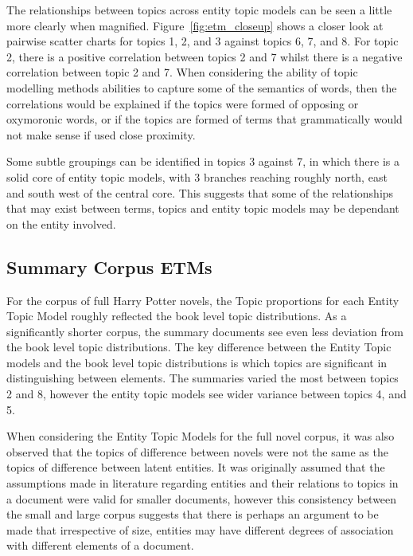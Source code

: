 \documentclass[10pt]{report}
\begin{document}
The relationships between topics across entity topic models can be seen a little more clearly when magnified. Figure~\ref{fig:etm_closeup} shows a closer look at pairwise scatter charts for topics 1, 2, and 3 against topics 6, 7, and 8. For topic 2, there is a positive correlation between topics 2 and 7 whilst there is a negative correlation between topic 2 and 7. When considering the ability of topic modelling methods abilities to capture some of the semantics of words, then the correlations would be explained if the topics were formed of opposing or oxymoronic words, or if the topics are formed of terms that grammatically would not make sense if used close proximity.

Some subtle groupings can be identified in topics 3 against 7, in which there is a solid core of entity topic models, with 3 branches reaching roughly north, east and south west of the central core. This suggests that some of the relationships that may exist between terms, topics and entity topic models may be dependant on the entity involved.

\clearpage
\subsection{Summary Corpus ETMs}

For the corpus of full Harry Potter novels, the Topic proportions for each Entity Topic Model roughly reflected the book level topic distributions. As a significantly shorter corpus, the summary documents see even less deviation from the book level topic distributions. The key difference between the Entity Topic models and the book level topic distributions is which topics are significant in distinguishing between elements. The summaries varied the most between topics 2 and 8, however the entity topic models see wider variance between topics 4, and 5.

When considering the Entity Topic Models for the full novel corpus, it was also observed that the topics of difference between novels were not the same as the topics of difference between latent entities. It was originally assumed that the assumptions made in literature regarding entities and their relations to topics in a document were valid for smaller documents, however this consistency between the small and large corpus suggests that there is perhaps an argument to be made that irrespective of size, entities may have different degrees of association with different elements of a document.
\end{document}
